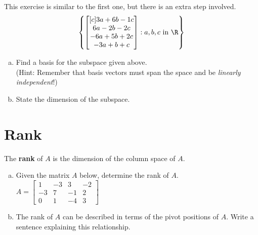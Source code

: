 \begin{exercise} %
	This exercise is similar to the first one, but there is an extra step involved.
	$$\left\{ \begin{bmatrix}[c] 3a+6b-1c \\ 6a-2b-2c \\ -6a+5b+2c \\ -3a+b+c \end{bmatrix} : a,b,c \text{ in } \R \right\}$$
	\begin{enumerate}[(a)]
		\item Find a basis for the subspace given above. \\
		(Hint: Remember that basis vectors must span the space and be \emph{linearly independent}!)
		\vfill
		\item State the dimension of the subspace.
		\vspace{2em}
	\end{enumerate}
\end{exercise}


\newpage


\section{Rank}
\name

\begin{boxdef}
	The \textbf{rank} of $A$ is the dimension of the column space of $A$.
\end{boxdef}

\begin{exercise} %
	\begin{enumerate}[(a)]
		\item Given the matrix $A$ below, determine the rank of $A$.\\
		$ A = \begin{bmatrix} 1&-3&3&-2 \\ -3&7&-1&2 \\ 0&1&-4&3 \end{bmatrix} $
		\vfill
		\item The rank of $A$ can be described in terms of the pivot positions of $A$. Write a sentence explaining this relationship.
		\vspace{.75in}
	\end{enumerate}
\end{exercise}



